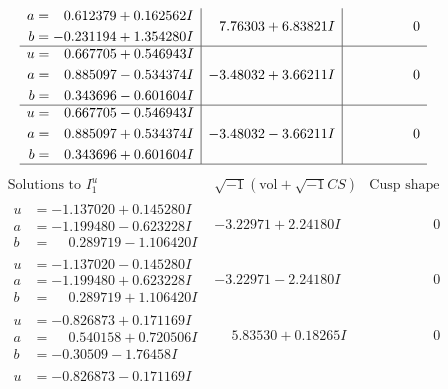 \documentclass[1p]{elsarticle_modified}
\theoremstyle{definition}
\newcommand{\I}{\sqrt{-1}}
\begin{document}
$$\begin{array}{c|c|c}
\begin{aligned}
a &= \phantom{-}0.612379 + 0.162562 I \\
b &= -0.231194 + 1.354280 I\end{aligned}
 & \phantom{-}7.76303 + 6.83821 I & \phantom{-0.000000 } 0 \\ \hline\begin{aligned}
u &= \phantom{-}0.667705 + 0.546943 I \\
a &= \phantom{-}0.885097 - 0.534374 I \\
b &= \phantom{-}0.343696 - 0.601604 I\end{aligned}
 & -3.48032 + 3.66211 I & \phantom{-0.000000 } 0 \\ \hline\begin{aligned}
u &= \phantom{-}0.667705 - 0.546943 I \\
a &= \phantom{-}0.885097 + 0.534374 I \\
b &= \phantom{-}0.343696 + 0.601604 I\end{aligned}
 & -3.48032 - 3.66211 I & \phantom{-0.000000 } 0\\
 \hline 
 \end{array}$$\newpage$$\begin{array}{c|c|c}  
\text{Solutions to }I^u_{1}& \I (\text{vol} + \sqrt{-1}CS) & \text{Cusp shape}\\
 \hline 
\begin{aligned}
u &= -1.137020 + 0.145280 I \\
a &= -1.199480 - 0.623228 I \\
b &= \phantom{-}0.289719 - 1.106420 I\end{aligned}
 & -3.22971 + 2.24180 I & \phantom{-0.000000 } 0 \\ \hline\begin{aligned}
u &= -1.137020 - 0.145280 I \\
a &= -1.199480 + 0.623228 I \\
b &= \phantom{-}0.289719 + 1.106420 I\end{aligned}
 & -3.22971 - 2.24180 I & \phantom{-0.000000 } 0 \\ \hline\begin{aligned}
u &= -0.826873 + 0.171169 I \\
a &= \phantom{-}0.540158 + 0.720506 I \\
b &= -0.30509 - 1.76458 I\end{aligned}
 & \phantom{-}5.83530 + 0.18265 I & \phantom{-0.000000 } 0 \\ \hline\begin{aligned}
u &= -0.826873 - 0.171169 I \\

\end{aligned}
\end{array}$$
\end{document}
